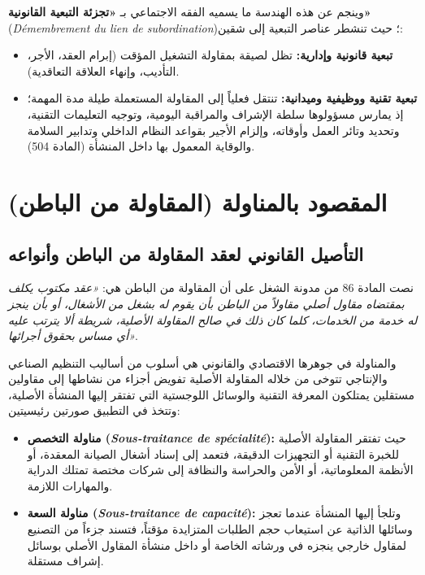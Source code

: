 وينجم عن هذه الهندسة ما يسميه الفقه الاجتماعي بـ \textbf{«تجزئة التبعية القانونية»} (\textit{Démembrement du lien de subordination})؛ حيث تنشطر عناصر التبعية إلى شقين:
\begin{itemize}[leftmargin=*, itemsep=4pt]
    \item \textbf{تبعية قانونية وإدارية:} تظل لصيقة بمقاولة التشغيل المؤقت (إبرام العقد، الأجر، التأديب، وإنهاء العلاقة التعاقدية).
    \item \textbf{تبعية تقنية ووظيفية وميدانية:} تنتقل فعلياً إلى المقاولة المستعملة طيلة مدة المهمة؛ إذ يمارس مسؤولوها سلطة الإشراف والمراقبة اليومية، وتوجيه التعليمات التقنية، وتحديد وتائر العمل وأوقاته، وإلزام الأجير بقواعد النظام الداخلي وتدابير السلامة والوقاية المعمول بها داخل المنشأة (المادة \textenglish{504}).
\end{itemize}

\section{المقصود بالمناولة (المقاولة من الباطن)}

\subsection{التأصيل القانوني لعقد المقاولة من الباطن وأنواعه}
نصت المادة \textenglish{86} من مدونة الشغل على أن المقاولة من الباطن هي: \textit{«عقد مكتوب يكلف بمقتضاه مقاول أصلي مقاولاً من الباطن بأن يقوم له بشغل من الأشغال، أو بأن ينجز له خدمة من الخدمات، كلما كان ذلك في صالح المقاولة الأصلية، شريطة ألا يترتب عليه أي مساس بحقوق أجرائها»}.

والمناولة في جوهرها الاقتصادي والقانوني هي أسلوب من أساليب التنظيم الصناعي والإنتاجي تتوخى من خلاله المقاولة الأصلية تفويض أجزاء من نشاطها إلى مقاولين مستقلين يمتلكون المعرفة التقنية والوسائل اللوجستية التي تفتقر إليها المنشأة الأصلية، وتتخذ في التطبيق صورتين رئيسيتين:
\begin{itemize}[leftmargin=*, itemsep=5pt]
    \item \textbf{مناولة التخصص (\textit{Sous-traitance de spécialité}):} حيث تفتقر المقاولة الأصلية للخبرة التقنية أو التجهيزات الدقيقة، فتعمد إلى إسناد أشغال الصيانة المعقدة، أو الأنظمة المعلوماتية، أو الأمن والحراسة والنظافة إلى شركات مختصة تمتلك الدراية والمهارات اللازمة.
    \item \textbf{مناولة السعة (\textit{Sous-traitance de capacité}):} وتلجأ إليها المنشأة عندما تعجز وسائلها الذاتية عن استيعاب حجم الطلبات المتزايدة مؤقتاً، فتسند جزءاً من التصنيع لمقاول خارجي ينجزه في ورشاته الخاصة أو داخل منشأة المقاول الأصلي بوسائل إشراف مستقلة.
\end{itemize}

